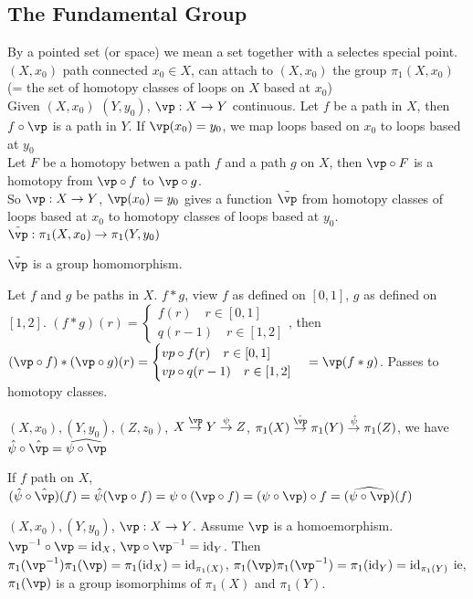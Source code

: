 
\subsection{The Fundamental Group}

By a pointed set (or space) we mean a set together with a selectes special point. \\
$(X, x_0)$ path connected $x_0 \in X$, can attach to $(X, x_0)$ the group $\pi_1(X, x_0)$ (= the set of homotopy classes of loops on $X$ based at $x_0$) \\
Given $(X, x_0)$ $(Y, y_0)$, $\vp: X \to Y$ continuous. Let $f$ be a path in $X$, then $f \circ \vp$ is a path in $Y$. If $\vp(x_0)=y_0$, we map loops based on $x_0$ to loops based at $y_0$ \\
Let $F$ be a homotopy betwen a path $f$ and a path $g$ on $X$, then $\vp \circ F$ is a homotopy from $\vp \circ f$ to $\vp \circ g$. \\
So $\vp: X \to Y$, $\vp(x_0)=y_0$ gives a function $\tilde{\vp}$ from homotopy classes of loops based at $x_0$ to homotopy classes of loops based at $y_0$. $\tilde{\vp}: \pi_1(X, x_0) \to \pi_1(Y, y_0)$ 

\begin{theorem}
    $\tilde{\vp}$ is a group homomorphism. 
\end{theorem}

\begin{pf}
    Let $f$ and $g$ be paths in $X$. $f*g$, view $f$ as defined on $[0,1]$, $g$ as defined on $[1,2]$. $(f*g)(r) = \begin{cases} f(r) \quad r \in [0,1] \\ q(r-1) \quad r \in [1,2] \end{cases}$, then $(\vp \circ f)*(\vp \circ g)(r) = \begin{cases} vp \circ f(r) \quad r \in [0,1] \\ vp \circ q(r-1) \quad r \in [1,2] \end{cases} = \vp(f*g)$. Passes to homotopy classes. 
\end{pf}

\begin{theorem}
    $(X, x_0), (Y, y_0), (Z, z_0)$, $X \stackrel{\vp}{\to} Y \stackrel{\psi}{\to} Z$, $\pi_1(X) \stackrel{\hat{\vp}}{\to} \pi_1(Y) \stackrel{\hat{\psi}}{\to} \pi_1(Z)$, we have $\hat{\psi} \circ \hat{\vp} = \widehat{\psi \circ \vp}$ 
\end{theorem}

\begin{pf}
    If $f$ path on $X$, $(\hat{\psi} \circ \hat{\vp})(f) = \hat{\psi}(\vp \circ f) = \psi \circ (\vp \circ f) = (\psi \circ \vp) \circ f = (\widehat{\psi \circ \vp})(f)$ 
\end{pf}

\noindent
$(X, x_0), (Y, y_0)$, $\vp: X \to Y$. Assume $\vp$ is a homoemorphism. $\vp^{-1} \circ \vp = \text{id}_X$, $\vp \circ \vp^{-1} = \text{id}_Y$. Then $\pi_1(\vp^{-1})\pi_1(\vp) = \pi_1(\text{id}_X) = \text{id}_{\pi_1(X)}$, $\pi_1(\vp)\pi_1(\vp^{-1}) = \pi_1(\text{id}_Y) = \text{id}_{\pi_1(Y)}$ ie, $\pi_1(\vp)$ is a group isomorphims of $\pi_1(X)$ and $\pi_1(Y)$. 